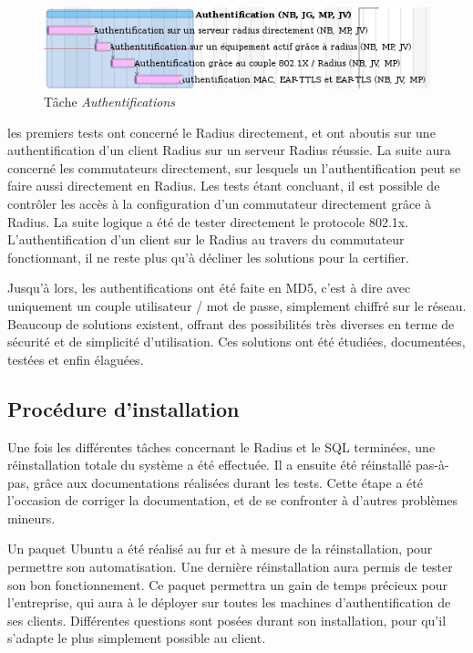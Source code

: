 \begin{figure}[!h]
	\label{gantt_auth}
	\begin{center}
		\includegraphics[width=350pt]{img/gantt_auth.png}
	\end{center}
	\caption{Tâche \textit{Authentifications}}
\end{figure}

les premiers tests ont concerné le Radius directement, et ont aboutis sur une authentification d'un client Radius sur un serveur Radius réussie. La suite aura concerné les commutateurs directement, sur lesquels un l'authentification peut se faire aussi directement en Radius. Les tests étant concluant, il est possible de contrôler les accès à la configuration d'un commutateur directement grâce à Radius. La suite logique a été de tester directement le protocole 802.1x. L'authentification d'un client sur le Radius au travers du commutateur fonctionnant, il ne reste plus qu'à décliner les solutions pour la certifier.

Jusqu'à lors, les authentifications ont été faite en MD5, c'est à dire avec uniquement un couple utilisateur / mot de passe, simplement chiffré sur le réseau. Beaucoup de solutions existent, offrant des possibilités très diverses en terme de sécurité et de simplicité d'utilisation. Ces solutions ont été étudiées, documentées, testées et enfin élaguées.

\subsection{Procédure d'installation}

Une fois les différentes tâches concernant le Radius et le SQL terminées, une réinstallation totale du système a été effectuée. Il a ensuite été réinstallé pas-à-pas, grâce aux documentations réalisées durant les tests. Cette étape a été l'occasion de corriger la documentation, et de se confronter à d'autres problèmes mineurs.

Un paquet Ubuntu a été réalisé au fur et à mesure de la réinstallation, pour permettre son automatisation. Une dernière réinstallation aura permis de tester son bon fonctionnement. Ce paquet permettra un gain de temps précieux pour l'entreprise, qui aura à le déployer sur toutes les machines d'authentification de ses clients. Différentes questions sont posées durant son installation, pour qu'il s'adapte le plus simplement possible au client.

